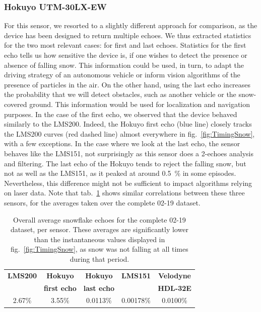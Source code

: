\subsubsection{Hokuyo UTM-30LX-EW}
For this sensor, we resorted to a slightly different approach for comparison, as the device has been designed to return multiple echoes. We thus extracted statistics for the two most relevant cases: for first and last echoes. Statistics for the first echo tells us how sensitive the device is, if one wishes to detect the presence or absence of falling snow. This information could be used, in turn, to adapt the driving strategy of an autonomous vehicle or inform vision algorithms of the presence of particles in the air. On the other hand, using the last echo increases the probability that we will detect obstacles, such as another vehicle or the snow-covered ground. This information would be used for localization and navigation purposes. In the case of the first echo, we observed that the device behaved similarly to the LMS200. Indeed, the Hokuyo first echo (blue line) closely tracks the LMS200 curves (red dashed line) almost everywhere in fig.~\ref{fig:TimingSnow}, with a few exceptions.  In the case where we look at the last echo, the sensor behaves like the LMS151, not surprisingly as this sensor does a 2-echoes analysis and filtering. The last echo of the Hokuyo tends to reject the falling snow, but not as well as the LMS151, as it peaked at around 0.5~\% in some episodes. Nevertheless, this difference might not be sufficient to impact algorithms relying on laser data. Note that tab.~\ref{tab:avgRates} shows similar correlations between these three sensors, for the averages taken over the complete 02-19 dataset. 

\begin{table}[htbp]
    \centering
    \begin{tabular}{|c|c|c|c|c|}
        \hline
        \textbf{LMS200}       & \textbf{Hokuyo}             & \textbf{Hokuyo}    & \textbf{LMS151}  & \textbf{Velodyne}  \\
                                        & \textbf{first echo}   & \textbf{last echo}  &                            & \textbf{HDL-32E}  \\\hline
                 2.67\%            &           3.55\%                &       0.0113\%      &       0.00178\%     &  0.0100\%  \\\hline
    \end{tabular}
    \caption{Overall average snowflake echoes for the complete 02-19 dataset, per sensor. These averages are significantly lower than the instantaneous values displayed in fig.~\ref{fig:TimingSnow}, as snow was not falling at all times during that period.}
    \label{tab:avgRates}
\end{table}

